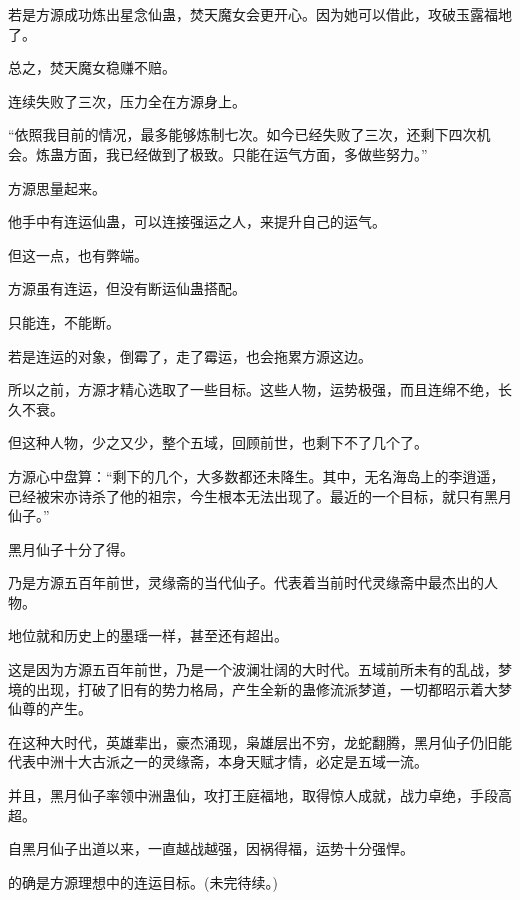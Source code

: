 \begin{this_body}
若是方源成功炼出星念仙蛊，焚天魔女会更开心。因为她可以借此，攻破玉露福地了。

总之，焚天魔女稳赚不赔。

连续失败了三次，压力全在方源身上。

“依照我目前的情况，最多能够炼制七次。如今已经失败了三次，还剩下四次机会。炼蛊方面，我已经做到了极致。只能在运气方面，多做些努力。”

方源思量起来。

他手中有连运仙蛊，可以连接强运之人，来提升自己的运气。

但这一点，也有弊端。

方源虽有连运，但没有断运仙蛊搭配。

只能连，不能断。

若是连运的对象，倒霉了，走了霉运，也会拖累方源这边。

所以之前，方源才精心选取了一些目标。这些人物，运势极强，而且连绵不绝，长久不衰。

但这种人物，少之又少，整个五域，回顾前世，也剩下不了几个了。

方源心中盘算：“剩下的几个，大多数都还未降生。其中，无名海岛上的李逍遥，已经被宋亦诗杀了他的祖宗，今生根本无法出现了。最近的一个目标，就只有黑月仙子。”

黑月仙子十分了得。

乃是方源五百年前世，灵缘斋的当代仙子。代表着当前时代灵缘斋中最杰出的人物。

地位就和历史上的墨瑶一样，甚至还有超出。

这是因为方源五百年前世，乃是一个波澜壮阔的大时代。五域前所未有的乱战，梦境的出现，打破了旧有的势力格局，产生全新的蛊修流派梦道，一切都昭示着大梦仙尊的产生。

在这种大时代，英雄辈出，豪杰涌现，枭雄层出不穷，龙蛇翻腾，黑月仙子仍旧能代表中洲十大古派之一的灵缘斋，本身天赋才情，必定是五域一流。

并且，黑月仙子率领中洲蛊仙，攻打王庭福地，取得惊人成就，战力卓绝，手段高超。

自黑月仙子出道以来，一直越战越强，因祸得福，运势十分强悍。

的确是方源理想中的连运目标。(未完待续。)

\end{this_body}


